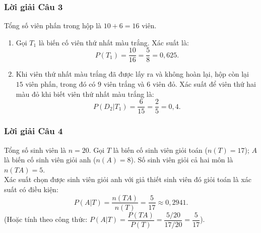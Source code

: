 \subsubsection*{Lời giải Câu 3}
Tổng số viên phấn trong hộp là $10 + 6 = 16$ viên.
\begin{enumerate}[label=\arabic*.]
    \item Gọi $T_1$ là biến cố viên thứ nhất màu trắng. Xác suất là:
    \[
    P(T_1) = \frac{10}{16} = \frac{5}{8} = 0{,}625.
    \]
    \item Khi viên thứ nhất màu trắng đã được lấy ra và không hoàn lại, hộp còn lại $15$ viên phấn, trong đó có $9$ viên trắng và $6$ viên đỏ.
    Xác suất để viên thứ hai màu đỏ khi biết viên thứ nhất màu trắng là:
    \[
    P(D_2|T_1) = \frac{6}{15} = \frac{2}{5} = 0{,}4.
    \]
\end{enumerate}

\subsubsection*{Lời giải Câu 4}
Tổng số sinh viên là $n = 20$.
Gọi $T$ là biến cố sinh viên giỏi toán ($n(T) = 17$); $A$ là biến cố sinh viên giỏi anh ($n(A) = 8$).
Số sinh viên giỏi cả hai môn là $n(TA) = 5$.\\
Xác suất chọn được sinh viên giỏi anh với giả thiết sinh viên đó giỏi toán là xác suất có điều kiện:
\[
P(A|T) = \frac{n(TA)}{n(T)} = \frac{5}{17} \approx 0{,}2941.
\]
(Hoặc tính theo công thức: $P(A|T) = \dfrac{P(TA)}{P(T)} = \dfrac{5/20}{17/20} = \dfrac{5}{17}$).

